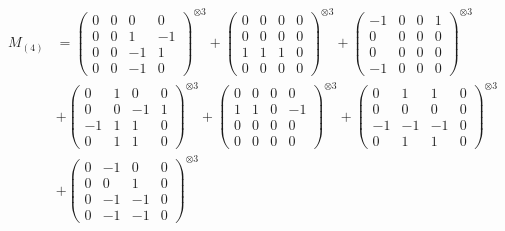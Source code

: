 \documentclass{article}
\newcommand{\Mthree}{%
    M_{(4)}
}
\begin{document}
        \newpage
        
        \footnotesize{
        \begin{align}
        \Mthree
        &= \label{Rs16-Rc11-Solution-8-c1} \begin{pmatrix} 0 & 0 & 0 & 0 \\ 0 & 0 & 1 & -1 \\ 0 & 0 & -1 & 1 \\ 0 & 0 & -1 & 0 \end{pmatrix}^{\otimes 3} 
            + \begin{pmatrix} 0 & 0 & 0 & 0 \\ 0 & 0 & 0 & 0 \\ 1 & 1 & 1 & 0 \\ 0 & 0 & 0 & 0 \end{pmatrix}^{\otimes 3} 
            + \begin{pmatrix} -1 & 0 & 0 & 1 \\ 0 & 0 & 0 & 0 \\ 0 & 0 & 0 & 0 \\ -1 & 0 & 0 & 0 \end{pmatrix}^{\otimes 3} \\
        &+ \label{Rs16-Rc11-Solution-8-c4} \begin{pmatrix} 0 & 1 & 0 & 0 \\ 0 & 0 & -1 & 1 \\ -1 & 1 & 1 & 0 \\ 0 & 1 & 1 & 0 \end{pmatrix}^{\otimes 3} 
            + \begin{pmatrix} 0 & 0 & 0 & 0 \\ 1 & 1 & 0 & -1 \\ 0 & 0 & 0 & 0 \\ 0 & 0 & 0 & 0 \end{pmatrix}^{\otimes 3} 
            + \begin{pmatrix} 0 & 1 & 1 & 0 \\ 0 & 0 & 0 & 0 \\ -1 & -1 & -1 & 0 \\ 0 & 1 & 1 & 0 \end{pmatrix}^{\otimes 3} \\
        &+ \label{Rs16-Rc11-Solution-8-c7} \begin{pmatrix} 0 & -1 & 0 & 0 \\ 0 & 0 & 1 & 0 \\ 0 & -1 & -1 & 0 \\ 0 & -1 & -1 & 0 \end{pmatrix}^{\otimes 3} 

\end{align}}
\end{document}
